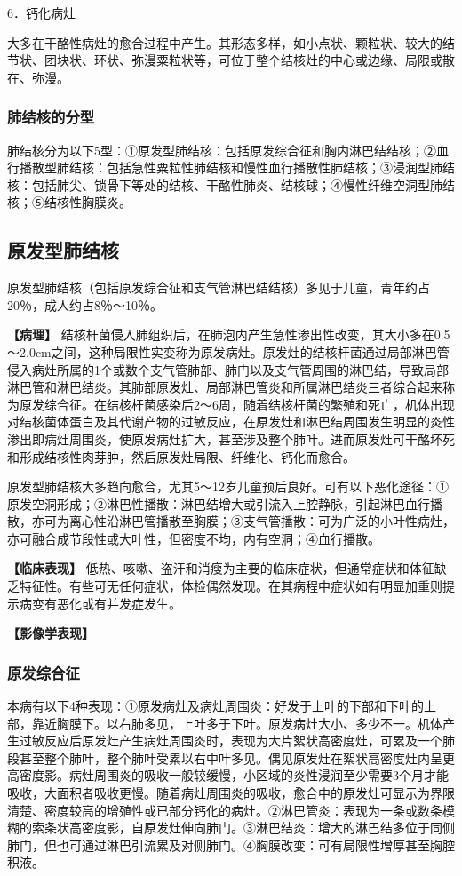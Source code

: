 6．钙化病灶

大多在干酪性病灶的愈合过程中产生。其形态多样，如小点状、颗粒状、较大的结节状、团块状、环状、弥漫粟粒状等，可位于整个结核灶的中心或边缘、局限或散在、弥漫。

\subsubsection{肺结核的分型}

肺结核分为以下5型：①原发型肺结核：包括原发综合征和胸内淋巴结结核；②血行播散型肺结核：包括急性粟粒性肺结核和慢性血行播散性肺结核；③浸润型肺结核：包括肺尖、锁骨下等处的结核、干酪性肺炎、结核球；④慢性纤维空洞型肺结核；⑤结核性胸膜炎。

\subsection{原发型肺结核}

原发型肺结核（包括原发综合征和支气管淋巴结结核）多见于儿童，青年约占20％，成人约占8％～10％。

\textbf{【病理】}
结核杆菌侵入肺组织后，在肺泡内产生急性渗出性改变，其大小多在0.5～2.0cm之间，这种局限性实变称为原发病灶。原发灶的结核杆菌通过局部淋巴管侵入病灶所属的1个或数个支气管肺部、肺门以及支气管周围的淋巴结，导致局部淋巴管和淋巴结炎。其肺部原发灶、局部淋巴管炎和所属淋巴结炎三者综合起来称为原发综合征。在结核杆菌感染后2～6周，随着结核杆菌的繁殖和死亡，机体出现对结核菌体蛋白及其代谢产物的过敏反应，在原发灶和淋巴结周围发生明显的炎性渗出即病灶周围炎，使原发病灶扩大，甚至涉及整个肺叶。进而原发灶可干酪坏死和形成结核性肉芽肿，然后原发灶局限、纤维化、钙化而愈合。

原发型肺结核大多趋向愈合，尤其5～12岁儿童预后良好。可有以下恶化途径：①原发空洞形成；②淋巴性播散：淋巴结增大或引流入上腔静脉，引起淋巴血行播散，亦可为离心性沿淋巴管播散至胸膜；③支气管播散：可为广泛的小叶性病灶，亦可融合成节段性或大叶性，但密度不均，内有空洞；④血行播散。

\textbf{【临床表现】}
低热、咳嗽、盗汗和消瘦为主要的临床症状，但通常症状和体征缺乏特征性。有些可无任何症状，体检偶然发现。在其病程中症状如有明显加重则提示病变有恶化或有并发症发生。

\textbf{【影像学表现】}

\subsubsection{原发综合征}

本病有以下4种表现：①原发病灶及病灶周围炎：好发于上叶的下部和下叶的上部，靠近胸膜下。以右肺多见，上叶多于下叶。原发病灶大小、多少不一。机体产生过敏反应后原发灶产生病灶周围炎时，表现为大片絮状高密度灶，可累及一个肺段甚至整个肺叶，整个肺叶受累以右中叶多见。偶见原发灶在絮状高密度灶内呈更高密度影。病灶周围炎的吸收一般较缓慢，小区域的炎性浸润至少需要3个月才能吸收，大面积者吸收更慢。随着病灶周围炎的吸收，愈合中的原发灶可显示为界限清楚、密度较高的增殖性或已部分钙化的病灶。②淋巴管炎：表现为一条或数条模糊的索条状高密度影，自原发灶伸向肺门。③淋巴结炎：增大的淋巴结多位于同侧肺门，但也可通过淋巴引流累及对侧肺门。④胸膜改变：可有局限性增厚甚至胸腔积液。

